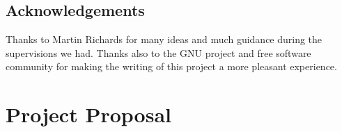 \documentclass[12pt,twoside]{report}
\begin{document}





\pagestyle{empty}



\cleardoublepage


\setcounter{page}{1}
\pagestyle{plain}


%

\cleardoublepage

\tableofcontents

\listoffigures

\newpage
\section*{Acknowledgements}

Thanks to Martin Richards for many ideas and much guidance during the supervisions we had. Thanks also to the GNU project and free software community for making the writing of this project a more pleasant experience.


\cleardoublepage	%

\setcounter{page}{1}
\pagestyle{headings}




\cleardoublepage


\cleardoublepage


\cleardoublepage


\cleardoublepage


\cleardoublepage



\cleardoublepage

\appendix


\cleardoublepage


\cleardoublepage


\cleardoublepage

\chapter{Project Proposal}

\newcommand \sigline {
\begin{picture}(150,1)
\put(0,0){\line(1,0){150}}
\end{picture}
}


\end{document}
